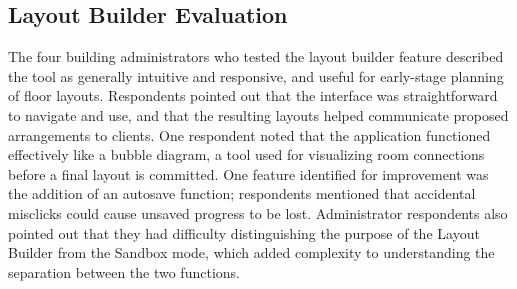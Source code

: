 \subsection{Layout Builder Evaluation}\label{sec:4.7.3}

The four building administrators who tested the layout builder feature described
the tool as generally intuitive and responsive, and useful for early-stage
planning of floor layouts. Respondents pointed out that the interface was
straightforward to navigate and use, and that the resulting layouts helped
communicate proposed arrangements to clients. One respondent noted that the
application functioned effectively like a bubble diagram, a tool used for
visualizing room connections before a final layout is committed. One feature
identified for improvement was the addition of an autosave function; respondents
mentioned that accidental misclicks could cause unsaved progress to be lost.
Administrator respondents also pointed out that they had difficulty
distinguishing the purpose of the Layout Builder from the Sandbox mode, which
added complexity to understanding the separation between the two functions.
